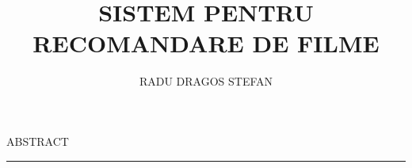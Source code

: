 \documentclass[12pt]{report}
\begin{document}
\title{SISTEM PENTRU RECOMANDARE DE FILME}					   
\author{RADU DRAGOS STEFAN}											
				
\maketitle


\newpage
\thispagestyle{empty}
\mbox{}
\newpage
{} 

\cleardoublepage
ABSTRACT
\vspace{0.5cm}	
\hrule
\vspace{0.5cm}	





\tableofcontents
\newpage
\listoffigures
\newpage
{}








\end{document}

